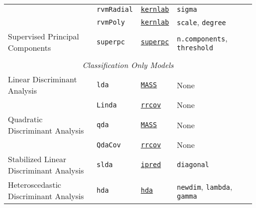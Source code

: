 \documentclass[12pt]{article}
\begin{document}
\begin{landscape}
\begin{longtable}{lllll}
\rowcolor[rgb]{.95, .95, .95}               
  &
         \texttt{rvmRadial} & 
            {\tt \href{http://cran.r-project.org/web/packages/kernlab/index.html}{kernlab}}       & 
            \texttt{sigma} \\              

\rowcolor[rgb]{.95, .95, .95}               
  &
         \texttt{rvmPoly} & 
            {\tt \href{http://cran.r-project.org/web/packages/kernlab/index.html}{kernlab}}       & 
            \texttt{scale}, \texttt{degree} \\                        
            
      Supervised Principal Components&
         \texttt{superpc}  &
         {\tt \href{http://cran.r-project.org/web/packages/superpc/index.html}{superpc}} &
         \texttt{n.components}, \texttt{threshold}\\
            
\\             
\multicolumn{5}{c}{{{\em Classification Only Models}}} \\ 

\rowcolor[rgb]{.95, .95, .95}         
      Linear Discriminant Analysis &
         \texttt{lda} & 
             {\tt \href{http://cran.r-project.org/web/packages/MASS/index.html}{MASS}}       &          
            None\\
\rowcolor[rgb]{.95, .95, .95}                     
          &
         \texttt{Linda} & 
              {\tt \href{http://cran.r-project.org/web/packages/rrcov/index.html}{rrcov}}       &          
            None\\
                        
            
      Quadratic Discriminant Analysis &
         \texttt{qda} & 
             {\tt \href{http://cran.r-project.org/web/packages/MASS/index.html}{MASS}}         &          
            None\\  
      &   \texttt{QdaCov} & 
             {\tt \href{http://cran.r-project.org/web/packages/rrcov/index.html}{rrcov}}        &          
            None\\            
            
\rowcolor[rgb]{.95, .95, .95}                     
      Stabilized Linear Discriminant Analysis&
         \texttt{slda} & 
              {\tt \href{http://cran.r-project.org/web/packages/ipred/index.html}{ipred}}        &          
            \texttt{diagonal}\\  
      
      Heteroscedastic Discriminant Analysis&
         \texttt{hda} & 
              {\tt \href{http://cran.r-project.org/web/packages/hda/index.html}{hda}}      &          
            \texttt{newdim}, \texttt{lambda}, \texttt{gamma}\\  
            

\end{longtable}
\end{landscape}
\end{document}
